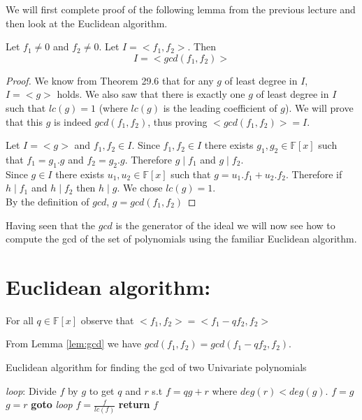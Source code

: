 We will first complete proof of the following lemma from the previous lecture and then look at the Euclidean algorithm.

\begin{lemma}
\label{lem:gcd}
Let $f_1 \neq 0$ and $f_2\neq 0$. Let $I = <f_1, f_2>$. Then
$$I=<gcd(f_1,f_2)>$$
\end{lemma}
\begin{proof}
We know from Theorem 29.6 that for any $g$ of least degree in $I$, $I=<g>$ holds. We also saw that there is exactly one $g$ of least degree in $I$ such that $lc(g)=1$ (where $lc(g)$ is the leading coefficient of $g$). We will prove that this $g$ is indeed $gcd(f_{1},f_{2})$, thus proving $<gcd(f_{1},f_{2})>=I$.

Let $I=<g>$ and $f_{1},f_{2}\in I$. Since $f_{1},f_{2}\in I$ there exists $g_{1},g_{2}\in \mathbb{F}[x]$ such that $f_{1}=g_{1}.g$ and $f_{2}=g_{2}.g$. Therefore $g\mid f_{1}$ and $g\mid f_{2}$. \\

Since $g\in I$ there exists $u_{1},u_{2}\in \mathbb{F}[x]$ such that $g=u_{1}.f_{1}+u_{2}.f_{2}$. Therefore if $h\mid f_{1}$ and 
$h\mid f_{2}$ then $h\mid g$. We chose $lc(g)=1$.\\
By the definition of $gcd$, $g=gcd(f_{1},f_{2})$
\end{proof}

Having seen that the $gcd$ is the generator of the ideal we will now see how to compute the gcd of the set of polynomials using the familiar Euclidean algorithm.


\section*{Euclidean algorithm:}
\begin{observation}
For all $q\in \mathbb{F}[x]$ observe that
$<f_{1},f_{2}>=<f_{1}-qf_{2},f_{2}>$
\end{observation}

From Lemma \ref{lem:gcd} we have $gcd(f_{1},f_{2})=gcd(f_{1}-qf_{2},f_{2})$.


\begin{algorithm}
\caption{Euclidean algorithm for finding the gcd of two Univariate polynomials}
\label{alg:euclid}
\begin{algorithmic}[1]
\State \emph{loop}:
\State Divide $f$ by $g$ to get $q$ and $r$ s.t $f=qg+r$ where $deg(r)< deg(g)$.
\State $f=g$
\State $g=r$
\State \textbf{goto} \emph{loop}
\EndIf
\State $f=\frac{f}{lc(f)}$
\State \textbf{return} $f$
\EndProcedure
\end{algorithmic}
\end{algorithm}



